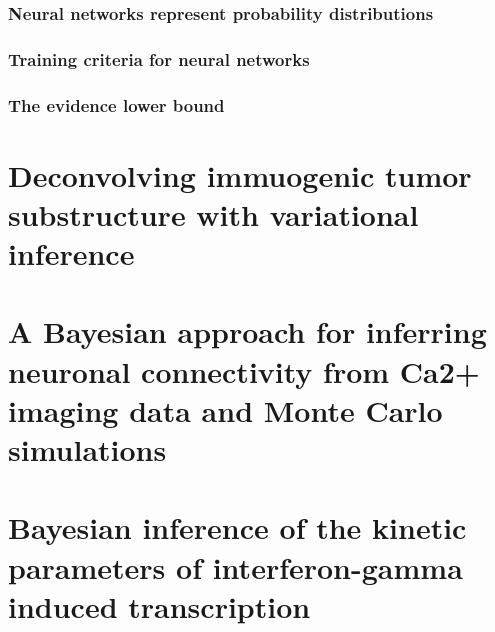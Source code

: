 \documentclass{ucetd}
\begin{document}
\subsection{Neural networks represent probability distributions}

\subsection{Training criteria for neural networks}

\subsection{The evidence lower bound}

\chapter{Deconvolving immuogenic tumor substructure with variational inference}

\chapter{A Bayesian approach for inferring neuronal connectivity from Ca2+ imaging data and Monte Carlo simulations}

\chapter{Bayesian inference of the kinetic parameters of interferon-gamma induced transcription}


\makebibliography
\end{document}
